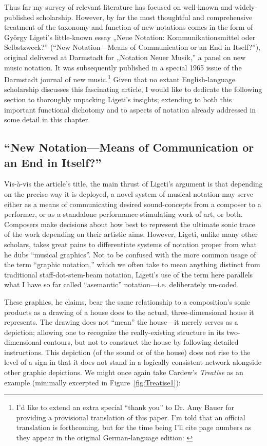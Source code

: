     Thus far my survey of relevant literature has focused on well-known and widely-published scholarship. However, by far the most thoughtful and comprehensive treatment of the taxonomy and function of new notations comes in the form of György Ligeti's little-known essay „Neue Notation: Kommunikationsmittel oder Selbstzweck?” (``New Notation---Means of Communication or an End in Itself?''), original delivered at Darmstadt for „Notation Neuer Musik,” a panel on new music notation. It was subsequently published in a special 1965 issue of the Darmstadt journal of new music.\footnote{
    I'd like to extend an extra special ``thank you'' to Dr. Amy Bauer for providing a provisional translation of this paper. I'm told that an official translation is forthcoming, but for the time being I'll cite page numbers as they appear in the original German-language edition: \autocite{Ligeti_1965}
    }
    Given that no extant English-language scholarship discusses this fascinating article, I would like to dedicate the following section to thoroughly unpacking Ligeti's insights; extending to both this important functional dichotomy and to aspects of notation already addressed in some detail in this chapter.

    \subsection{``New Notation---Means of Communication or an End in Itself?''}

    Vis-à-vis the article's title, the main thrust of Ligeti's argument is that depending on the precise way it is deployed, a novel system of musical notation may serve either as a means of communicating desired sound-concepts from a composer to a performer, or as a standalone performance-stimulating work of art, or both. Composers make decisions about how best to represent the ultimate sonic trace of the work depending on their artistic aims. However, Ligeti, unlike many other scholars, takes great pains to differentiate systems of notation proper from what he dubs ``musical graphics''. Not to be confused with the more common usage of the term ``graphic notation,'' which we often take to mean anything distinct from traditional staff-dot-stem-beam notation, Ligeti's use of the term here parallels what I have so far called ``asemantic'' notation---i.e. deliberately un-coded.
    
    These graphics, he claims, bear the same relationship to a composition's sonic products as a drawing of a house does to the actual, three-dimensional house it represents. The drawing does not ``mean'' the house---it merely serves as a depiction; allowing one to recognize the really-existing structure in its two-dimensional contours, but not to construct the house by following detailed instructions.  This depiction (of the sound or of the house) does not rise to the level of a sign in that it does not stand in a logically consistent network alongside other graphic depictions. We might once again take Cardew's \textit{Treatise} as an example (minimally excerpted in Figure~\ref{fig:Treatise1}):

